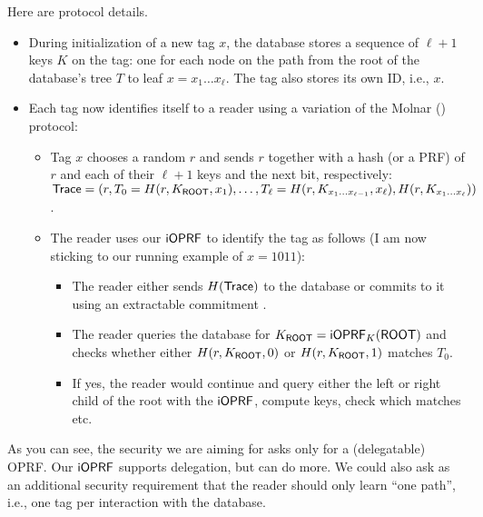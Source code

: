 \documentclass{article}
\begin{document}
Here are protocol details.
\begin{itemize}
  
\item During initialization of a new tag $x$, the database stores a
  sequence of $\ell+1$ keys $K$ on the tag: one for each node on the
  path from the root of the database's tree $T$ to leaf
  $x=x_1\ldots{}x_\ell$. The tag also stores its own ID, i.e., $x$.

\item Each tag now identifies itself to a reader using a variation of
  the Molnar () protocol:

  \begin{itemize}
  \item Tag $x$ chooses a random $r$ and sends $r$ together with a
    hash (or a PRF) of $r$ and each of their $\ell+1$ keys and the
    next bit, respectively:
    $\mathsf{Trace}=(r,T_0=H(r,
    K_{\mathsf{ROOT}},x_1),\ldots,T_\ell=H(r,K_{x_1\ldots{}x_{\ell-1}},x_{\ell}),H(r,K_{x_1\ldots{}x_\ell}))$.

\item The reader uses our $\mathsf{i}\mathsf{OPRF}$ to identify the tag as follows (I am now sticking to our running example of $x=1011$):

 \begin{itemize}

 \item The reader either sends $H(\mathsf{Trace})$ to the database or
   commits to it using an extractable commitment .
   
  \item The reader queries the database for
    $K_{\mathsf{ROOT}}=\mathsf{i}\mathsf{OPRF}_K(\mathsf{ROOT})$ and checks whether either $H(r,K_{\mathsf{ROOT}},0)$ or $H(r,K_{\mathsf{ROOT}},1)$  matches
    $T_0$.

  \item If yes, the reader would continue and query either the left or
    right child of the root with the $\mathsf{i}\mathsf{OPRF}$, compute keys, check
    which matches etc.
\end{itemize}
  \end{itemize}
\end{itemize}

As you can see, the security we are aiming for asks only for a
(delegatable) OPRF. Our $\mathsf{i}\mathsf{OPRF}$ supports delegation, but can do more. We
could also ask as an additional security requirement that the reader
should only learn ``one path'', i.e., one tag per interaction with the
database. 
\end{document}
